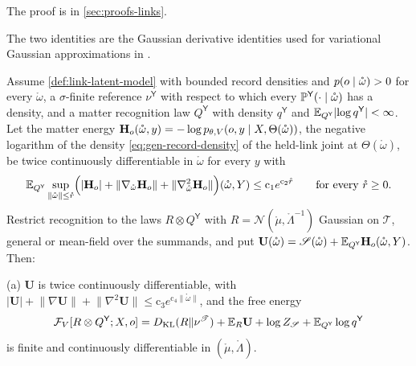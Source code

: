 The proof is in \cref{sec:proofs-links}.

The two identities are the Gaussian derivative identities used for variational Gaussian approximations
in \citet[Eqs.~(18)--(19)]{OpperArchambeau2009}.

Assume \cref{def:link-latent-model} with bounded record densities and $p(o\mid\mathring\omega)>0$ for every
$\mathring\omega$, a $\sigma$-finite reference $\nu^{\mathsf Y}$ with respect to which every
$\mathbb P^{\mathsf Y}(\cdot\mid\mathring\omega)$ has a density, and a matter recognition law $Q^{\mathsf Y}$
with density $q^{\mathsf Y}$ and $\mathbb E_{Q^{\mathsf Y}}\lvert\log q^{\mathsf Y}\rvert<\infty$. Let the matter energy
$\mathbf H_o(\mathring\omega,y)=-\log p_{\theta,V}(o,y\mid X,\Theta(\mathring\omega))$, the negative logarithm
of the density \eqref{eq:gen-record-density} of the held-link joint at $\Theta(\mathring\omega)$, be twice
continuously differentiable in $\mathring\omega$ for every $y$ with
\begin{equation}
\mathbb E_{Q^{\mathsf Y}}\sup_{\lVert\mathring\omega\rVert\leq\mathring r}\Bigl(\lvert\mathbf H_o\rvert+\lVert\nabla_{\mathring\omega}\mathbf H_o\rVert
+\lVert\nabla^2_{\mathring\omega}\mathbf H_o\rVert\Bigr)(\mathring\omega,Y)\leq\mathrm c_1e^{\mathrm c_2\mathring r}
\qquad\text{for every }\mathring r\geq0.
\label{eq:link-matter-domination}
\end{equation}
Restrict recognition to the laws $R\otimes Q^{\mathsf Y}$ with $R=\mathcal N(\mathring\mu,\mathring\Lambda^{-1})$
Gaussian on $\mathscr T$, general or mean-field over the summands, and put
$\mathbf U(\mathring\omega)=\mathscr S(\mathring\omega)+\mathbb E_{Q^{\mathsf Y}}\mathbf H_o(\mathring\omega,Y)$. Then:

(a) $\mathbf U$ is twice continuously differentiable, with
$\lvert\mathbf U\rvert+\lVert\nabla\mathbf U\rVert+\lVert\nabla^2\mathbf U\rVert\leq\mathrm c_3e^{\mathrm c_4\lVert\mathring\omega\rVert}$,
and the free energy
\begin{equation}
\mathcal F_V[R\otimes Q^{\mathsf Y};X,o]=D_{\mathrm{KL}}(R\Vert\nu^{\mathscr T})+\mathbb E_R\mathbf U+\log Z_{\mathscr S}
+\mathbb E_{Q^{\mathsf Y}}\log q^{\mathsf Y}
\label{eq:link-field-free-energy}
\end{equation}
is finite and continuously differentiable in $(\mathring\mu,\mathring\Lambda)$.

